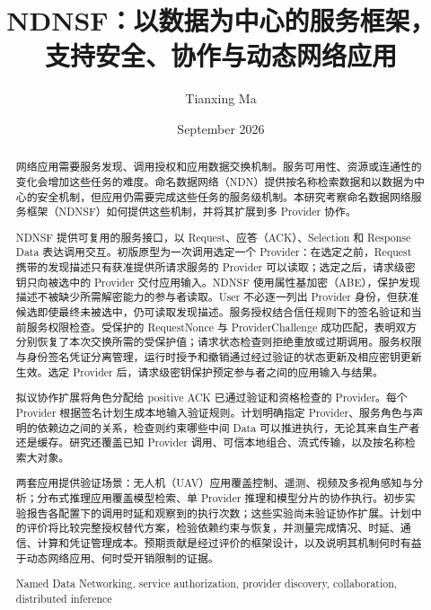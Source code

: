 \documentclass[
    doctoral,
    proposal,
    showabstract,
    secnum,
    nohyphenation,
    pdfonly,
    noboundcover
]{uofm}
\title{NDNSF：以数据为中心的服务框架，支持安全、协作与动态网络应用}
\author{Tianxing Ma}
\date{September 2026}
\begin{document}
\hypersetup{pageanchor=false}
\maketitle

\frontmatter
\hypersetup{pageanchor=true}

\begin{abstract}
网络应用需要服务发现、调用授权和应用数据交换机制。服务可用性、资源或连通性的变化会增加这些任务的难度。命名数据网络（NDN）提供按名称检索数据和以数据为中心的安全机制，但应用仍需要完成这些任务的服务级机制。本研究考察命名数据网络服务框架（NDNSF）如何提供这些机制，并将其扩展到多 Provider 协作。

NDNSF 提供可复用的服务接口，以 Request、应答（ACK）、Selection 和 Response Data 表达调用交互。初版原型为一次调用选定一个 Provider：在选定之前，Request 携带的发现描述只有获准提供所请求服务的 Provider 可以读取；选定之后，请求级密钥只向被选中的 Provider 交付应用输入。NDNSF 使用属性基加密（ABE），保护发现描述不被缺少所需解密能力的参与者读取。User 不必逐一列出 Provider 身份，但获准候选即使最终未被选中，仍可读取发现描述。服务授权结合信任规则下的签名验证和当前服务权限检查。受保护的 RequestNonce 与 ProviderChallenge 成功匹配，表明双方分别恢复了本次交换所需的受保护值；请求状态检查则拒绝重放或过期调用。服务权限与身份签名凭证分离管理，运行时授予和撤销通过经过验证的状态更新及相应密钥更新生效。选定 Provider 后，请求级密钥保护预定参与者之间的应用输入与结果。

拟议协作扩展将角色分配给 positive ACK 已通过验证和资格检查的 Provider。每个 Provider 根据签名计划生成本地输入验证规则。计划明确指定 Provider、服务角色与声明的依赖边之间的关系，检查则约束哪些中间 Data 可以推进执行，无论其来自生产者还是缓存。研究还覆盖已知 Provider 调用、可信本地组合、流式传输，以及按名称检索大对象。

两套应用提供验证场景：无人机（UAV）应用覆盖控制、遥测、视频及多视角感知与分析；分布式推理应用覆盖模型检索、单 Provider 推理和模型分片的协作执行。初步实验报告各配置下的调用时延和观察到的执行次数；这些实验尚未验证协作扩展。计划中的评价将比较完整授权替代方案，检验依赖约束与恢复，并测量完成情况、时延、通信、计算和凭证管理成本。预期贡献是经过评价的框架设计，以及说明其机制何时有益于动态网络应用、何时受开销限制的证据。
\begin{keywords}
Named Data Networking, service authorization, provider discovery, collaboration, distributed inference
\end{keywords}
\end{abstract}
\tableofcontents
\mainmatter
\newcommand{\proposalroot}{.}

\appendix



\end{document}
